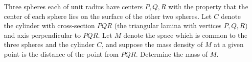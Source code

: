 Three spheres each of unit radius have centers $P, Q, R$ with the property that
the center of each sphere lies on the surface of the other two spheres. Let $C$
denote the cylinder with cross-section $PQR$ (the triangular lamina with
vertices $P, Q, R$) and axis perpendicular to $PQR$. Let $M$ denote the space
which is common to the three spheres and the cylinder $C$, and suppose the mass
density of $M$ at a given point is the distance of the point from $PQR$.
Determine the mass of $M$.
